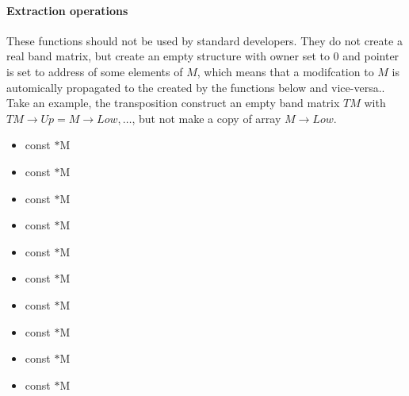\paragraph{Extraction operations} These functions should not be used by
standard developers.  They do not create a real band matrix, but create an
empty structure with owner set to $0$ and pointer is set to address of some
elements of $M$, which means that a modifcation to $M$ is automically
propagated to the  created by the functions below and
vice-versa..  Take an example, the transposition construct an empty band
matrix $TM$ with $TM\rightarrow Up = M\rightarrow Low, \dots $, but not make a
copy of array $M\rightarrow Low$.
\begin{itemize}
\item {}
  {const  $\ast$M}
\item {}
  {const  $\ast$M}
\item {}
  {const  $\ast$M}
\item {}
  {const  $\ast$M}
\item {}
  {const  $\ast$M}
\item {}
  {const  $\ast$M}
\item {}
  {const  $\ast$M}
\item {}
  {const  $\ast$M}
\item
  {const  $\ast$M}
\item
  {const  $\ast$M}
\end{itemize}

